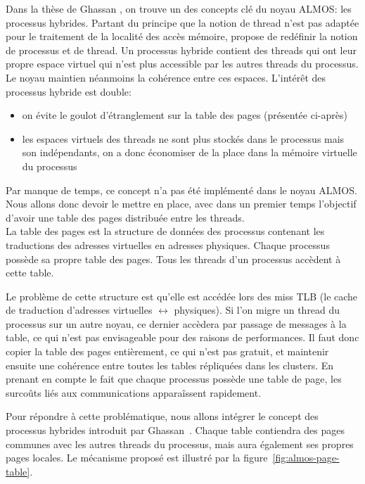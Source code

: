       Dans la thèse de Ghassan \citet{almaless2014universite}, on trouve un des
      concepts clé du noyau ALMOS: les processus hybrides. Partant du principe
      que la notion de thread n'est pas adaptée pour le traitement de la
      localité des accès mémoire,\citeauthor{almaless2014universite} propose de
      redéfinir la notion de processus et de thread. Un processus hybride
      contient des threads qui ont leur propre espace virtuel qui n'est plus
      accessible par les autres threads du processus. Le noyau maintien
      néanmoins la cohérence entre ces espaces. L'intérêt des processus hybride
      est double:
      \begin{itemize}
        \item on évite le goulot d'étranglement sur la table des pages
          (présentée ci-après)
        \item les espaces virtuels des threads ne sont plus stockés dans le
          processus mais son indépendants, on a donc économiser de la place dans
          la mémoire virtuelle du processus
      \end{itemize}

      Par manque de temps, ce concept n'a pas été implémenté dans le noyau
      ALMOS. Nous allons donc devoir le mettre en place, avec dans un premier
      temps l'objectif d'avoir une table des pages distribuée entre les
      threads.\\

      La table des pages est la structure de données des processus contenant les
      traductions des adresses virtuelles en adresses physiques. Chaque
      processus possède sa propre table des pages. Tous les threads d'un
      processus accèdent à cette table.

      Le problème de cette structure est qu'elle est accédée lors des miss TLB
      (le cache de traduction d'adresses virtuelles $\leftrightarrow$
      physiques). Si l'on migre un thread du processus sur un autre noyau, ce
      dernier accèdera par passage de messages à la table, ce qui n'est pas
      envisageable pour des raisons de performances. Il faut donc copier la
      table des pages entièrement, ce qui n'est pas gratuit, et maintenir
      ensuite une cohérence entre toutes les tables répliquées dans les
      clusters. En prenant en compte le fait que chaque processus possède une
      table de page, les surcoûts liés aux communications apparaîssent
      rapidement.

      Pour répondre à cette problématique, nous allons intégrer le concept des
      processus hybrides introduit par
      Ghassan~\citeauthor{almaless2014universite}. Chaque table contiendra des
      pages communes avec les autres threads du processus, mais aura également
      ses propres pages locales. Le mécanisme proposé est illustré par la
      figure~\ref{fig:almos-page-table}.

